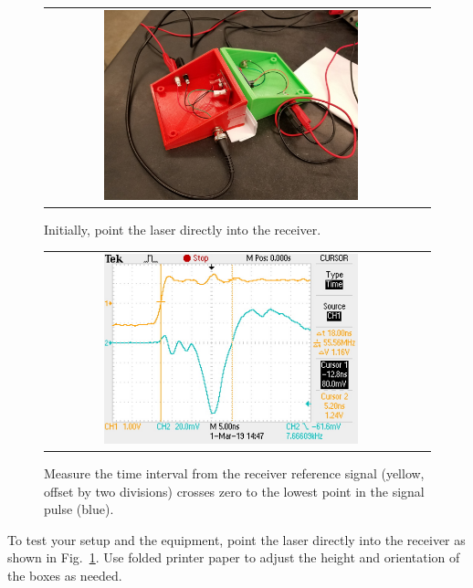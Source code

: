 \begin{figure}[htbp]
\begin{center}
\begin{tabular}{cc}
\includegraphics[width=0.7\textwidth]{figs/labs/c_air/tzero.jpg}
\end{tabular}
\end{center}
\caption{\label{fig:ctzero} Initially, point the laser directly into the receiver.}
\end{figure}

\begin{figure}[htbp]
\begin{center}
\begin{tabular}{cc}
\includegraphics[width=0.7\textwidth]{figs/labs/c_air/time_zero.jpg}
\end{tabular}
\end{center}
\caption{\label{fig:ctime} Measure the time interval from the receiver reference signal (yellow, offset by two divisions) crosses zero to the lowest point in the signal pulse (blue).}
\end{figure}

To test your setup and the equipment, point the laser directly into
the receiver as shown in Fig.~\ref{fig:ctzero}.  Use folded printer
paper to adjust the height and orientation of the boxes as needed.  

